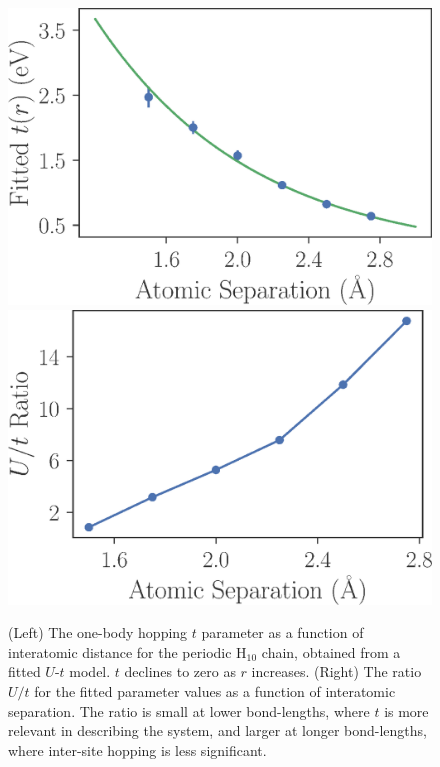 \begin{figure}
\centering
\includegraphics[scale=0.5]{./Figures/fitted_t_values_no_offset_h10_chain.eps}
\includegraphics[scale=0.5]{./Figures/Ust_ratio_vs_separation_h_chain.eps}
\caption{(Left) The one-body hopping $t$ parameter as a function of interatomic distance for the periodic H$_{10}$ chain, obtained from a fitted $U$-$t$ model. $t$ declines to zero as $r$ increases. (Right) The ratio $U/t$ for the fitted parameter values as a function of interatomic separation. The ratio is small at lower bond-lengths, where $t$ is more relevant in describing the system, and larger at longer bond-lengths, where inter-site hopping is less significant. }\label{fig:Parameters-vs-Bond-t}
\end{figure}

